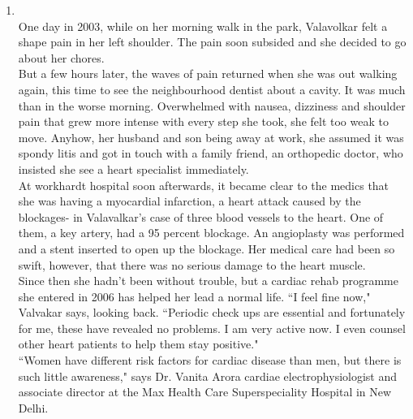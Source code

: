 \documentclass[12pt]{article}
\begin{document}
\begin{enumerate}
      These heat treatments take place during the various shaping operations. We can obtain bars and sheets of steel by rolling the metal through huge rolls in a rolling-mill. The roll pressures must be much greater for cold rolling than for hot rolling, but cold rolling enables the operators to produce rolls of great accuracy and uniformity, and with a better surface finish. Other shaping operations include drawing into wire, casting in moulds, and forging.

    \item {}\\
      One day in 2003, while on her morning walk in the park, Valavolkar felt a shape pain in her left shoulder. The pain soon subsided and she decided to go about her chores.\\

      But a few hours later, the waves of pain returned when she was out walking again, this time to see the neighbourhood dentist about a cavity. It was much than in the worse morning. Overwhelmed with nausea, dizziness and shoulder pain that grew more intense with every step she took, she felt too weak to move. Anyhow, her husband and son being away at work, she assumed it was spondy litis and got in touch with a family friend, an orthopedic doctor, who insisted she see a heart specialist immediately.\\

      At workhardt hospital soon afterwards, it became clear to the medics that she was having a myocardial infarction, a heart attack caused by the blockages- in Valavalkar's case of three blood vessels to the heart. One of them, a key artery, had a 95 percent blockage. An angioplasty was performed and a stent inserted to open up the blockage. Her medical care had been so swift, however, that there was no serious damage to the heart muscle.\\

      Since then she hadn't been without trouble, but a cardiac rehab programme she entered in 2006 has helped her lead a normal life. ``I feel fine now," Valvakar says, looking back. ``Periodic check ups are essential and fortunately for me, these have revealed no problems. I am very active now. I even counsel other heart patients to help them stay positive."\\

      ``Women have different risk factors for cardiac disease than men, but there is such little awareness," says Dr. Vanita Arora cardiae electrophysiologist and associate director at the Max Health Care Superspeciality Hospital in New Delhi.


\end{enumerate}
\end{document}
